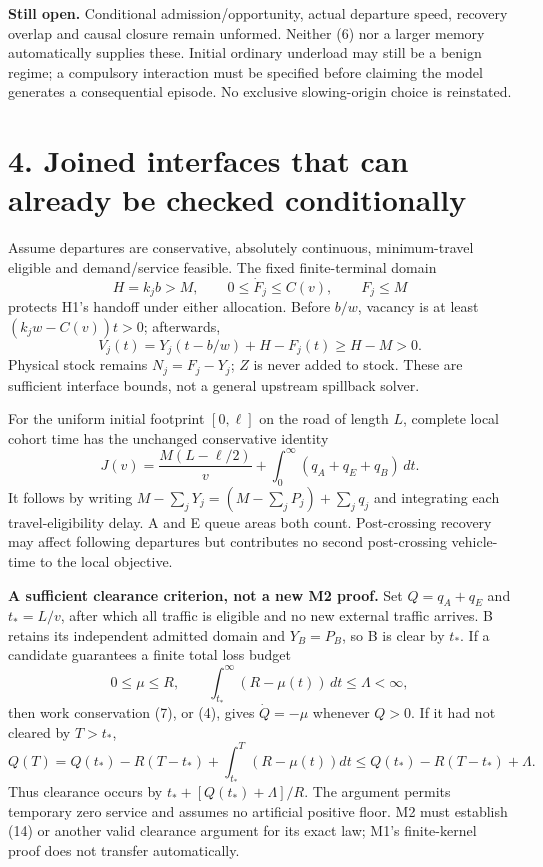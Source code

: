 \documentclass[11pt,a4paper]{article}
\begin{document}
\textbf{Still open.} Conditional admission/opportunity, actual departure
speed, recovery overlap and causal closure remain unformed. Neither (6)
nor a larger memory automatically supplies these. Initial ordinary
underload may still be a benign regime; a compulsory interaction must be
specified before claiming the model generates a consequential episode.
No exclusive slowing-origin choice is reinstated.

\newpage
\section*{4. Joined interfaces that can already be checked conditionally}

Assume departures are conservative, absolutely continuous, minimum-travel
eligible and demand/service feasible. The fixed finite-terminal domain
\begin{equation}
 H=k_jb>M,\qquad 0\leq\dot F_j\leq C(v),\qquad F_j\leq M \tag{11}
\end{equation}
protects H1's handoff under either allocation. Before $b/w$, vacancy is
at least $(k_jw-C(v))t>0$; afterwards,
\begin{equation}
 V_j(t)=Y_j(t-b/w)+H-F_j(t)\geq H-M>0. \tag{12}
\end{equation}
Physical stock remains $N_j=F_j-Y_j$; $Z$ is never added to stock. These
are sufficient interface bounds, not a general upstream spillback solver.

For the uniform initial footprint $[0,\ell]$ on the road of length $L$,
complete local cohort time has the unchanged conservative identity
\begin{equation}
 J(v)=\frac{M(L-\ell/2)}v+
       \int_0^\infty(q_A+q_E+q_B)\,dt. \tag{13}
\end{equation}
It follows by writing $M-\sum_jY_j=(M-\sum_jP_j)+\sum_jq_j$ and
integrating each travel-eligibility delay. A and E queue areas both count.
Post-crossing recovery may affect following departures but contributes no
second post-crossing vehicle-time to the local objective.

\textbf{A sufficient clearance criterion, not a new M2 proof.} Set
$Q=q_A+q_E$ and $t_*=L/v$, after which all traffic is eligible and no new
external traffic arrives. B retains its independent admitted domain and
$Y_B=P_B$, so B is clear by $t_*$. If a candidate guarantees a finite total loss
budget
\begin{equation}
 0\leq\mu\leq R,\qquad
 \int_{t_*}^{\infty}(R-\mu(t))\,dt\leq\Lambda<\infty, \tag{14}
\end{equation}
then work conservation (7), or (4), gives $\dot Q=-\mu$ whenever $Q>0$.
If it had not cleared by $T>t_*$,
\begin{equation}
 Q(T)=Q(t_*)-R(T-t_*)+
       \int_{t_*}^T(R-\mu(t))dt
 \leq Q(t_*)-R(T-t_*)+\Lambda. \tag{15}
\end{equation}
Thus clearance occurs by $t_*+[Q(t_*)+\Lambda]/R$. The argument permits
temporary zero service and assumes no artificial positive floor. M2 must
establish (14) or another valid clearance argument for its exact law;
M1's finite-kernel proof does not transfer automatically.
\end{document}
